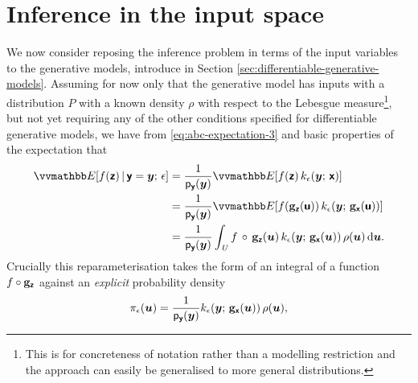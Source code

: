 
\section{Inference in the input space}\label{sec:cond-inf}

We now consider reposing the inference problem in terms of the input variables to the generative models, introduce in Section \ref{sec:differentiable-generative-models}. Assuming for now only that the generative model has inputs with a distribution $P$ with a known density $\rho$ with respect to the Lebesgue measure\footnote{This is for concreteness of notation rather than a modelling restriction and  the approach can easily be generalised to more general distributions.}, but not yet requiring any of the other conditions specified for differentiable generative models, we have from \eqref{eq:abc-expectation-3} and basic properties of the expectation that
\begin{align}\label{eq:abc-expectation-input-space}
  \expc{f(\rvct{z}) \gvn \rvct{y}=\vct{y};\,\epsilon} &=
  \frac{1}{\pden{\rvct{y}}(\vct{y})} \expc{f(\rvct{z}) \, k_\epsilon(\vct{y};\,\rvct{x})}
  \\
  &=
  \frac{1}{\pden{\rvct{y}}(\vct{y})} 
  \expc{f\lpa\genfunc_{\rvct{z}}(\rvct{u})\rpa \, k_\epsilon\lpa\vct{y};\,\genfunc_{\rvct{x}}(\rvct{u})\rpa}
  \\
  &=
  \frac{1}{\pden{\rvct{y}}(\vct{y})}
  \int_{\set{U}} 
    f\,\circ\,\genfunc_{\rvct{z}}(\vct{u}) \,
    k_\epsilon{\lpa\vct{y};\,\genfunc_{\rvct{x}}(\vct{u})\rpa}\,
    \rho(\vct{u})
  \,\dr\vct{u}.
\end{align}
Crucially this reparameterisation takes the form of an integral of a function $f\circ{\mathbf{g}}_{\boldsymbol{\mathsf{z}}}$ against an \emph{explicit} probability density 
\begin{equation}\label{eq:abc-density-input-space}
  \pi_\epsilon(\vct{u}) = \frac{1}{\pden{\rvct{y}}(\vct{y})} 
  k_\epsilon{\lpa\vct{y};\,\genfunc_{\rvct{x}}(\vct{u})\rpa}\,\rho(\vct{u}),
\end{equation}
